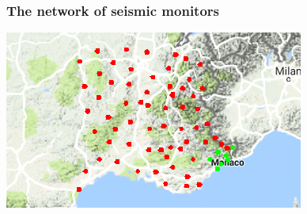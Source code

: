\documentclass{beamer}
\begin{document}
\begin{frame}
\frametitle{The network of seismic monitors}
\includegraphics[width=\textwidth]{InitialStationSet_zoom.png}
\end{frame}
\end{document}
